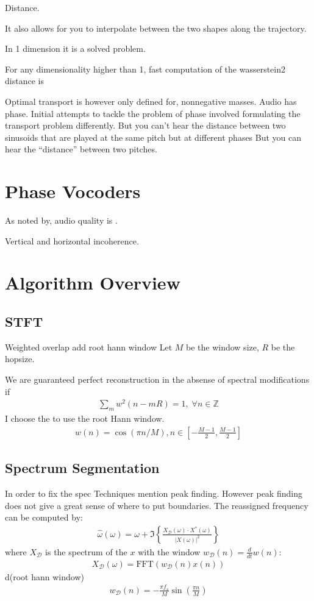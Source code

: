 \documentclass[12pt]{article}
\newcommand{\fft}{\text{FFT}}
\begin{document}
Distance. 

It also allows for you to interpolate between the two shapes along the trajectory.

In 1 dimension it is a solved problem.

For any dimensionality higher than 1, fast computation of the wasserstein2 distance is 

Optimal transport is however only defined for, nonnegative masses.
Audio has phase.
Initial attempts to tackle the problem of phase involved formulating the transport problem differently.
But you can't hear the distance between two sinusoids that are played at the same pitch but at different phases
But you can hear the ``distance'' between two pitches.

\section{Phase Vocoders}
As noted by, 
audio quality is .

Vertical and horizontal incoherence.


\section{Algorithm Overview}

\subsection{STFT}
Weighted overlap add
root hann window
Let $M$ be the window size, $R$ be the hopsize.

We are guaranteed perfect reconstruction in the absense of spectral modifications if
\begin{align*}
  \sum_m w^2(n - mR) = 1,\;\forall n\in\mathbb{Z}
\end{align*}
I choose the to use the root Hann window.
\begin{align*}
  w(n) = 
  \cos(\pi n / M), 
  n\in
  \left[
  -\frac{M-1}{2}, 
  \frac{M-1}{2}
\right]
\end{align*}

\subsection{Spectrum Segmentation}
In order to fix the spec
Techniques mention peak finding.
However peak finding does not give a great sense of where to put boundaries. 
The reassigned frequency can be computed by:
\begin{align}
  \hat{\omega}(\omega) = 
  \omega + 
  \Im\left\{%
    \frac{X_\mathcal{D}(\omega)\cdot X^*(\omega)}{|X(\omega)|^2}
  \right\}
\end{align}
where $X_\mathcal{D}$ is the spectrum of the $x$ with the window
$w_\mathcal{D}(n) = \frac{d}{dt}w(n)$:
\begin{align}
  X_\mathcal{D}(\omega) = \fft\left(w_\mathcal{D}(n)x(n)\right)
\end{align}
d(root hann window)
\begin{align*}
   w_\mathcal{D}(n) = -\frac{\pi f_s}{M}\sin\left(\frac{\pi n}{M}\right)
\end{align*}
\end{document}
